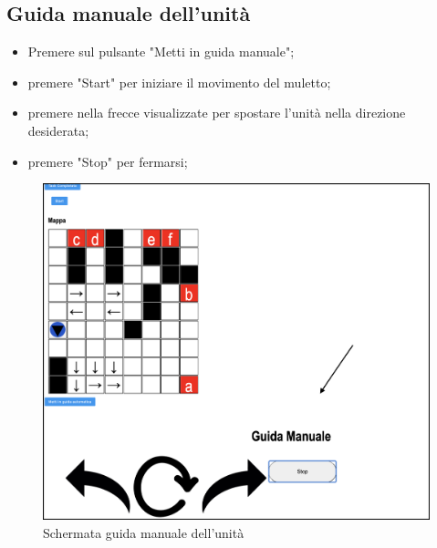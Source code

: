 \subsection{Guida manuale dell'unità}
\begin{itemize}
    \item Premere sul pulsante "Metti in guida manuale";
    \item premere "Start" per iniziare il movimento del muletto;
    \item premere nella frecce visualizzate per spostare l'unità nella direzione desiderata;
    \item premere "Stop" per fermarsi;
\end{itemize}
\begin{figure}[H]
    \centering
  	\includegraphics[scale=0.45]{res/images/forklift_guidamanuale.png}
  	\caption{Schermata guida manuale dell'unità}
\end{figure}
\pagebreak

